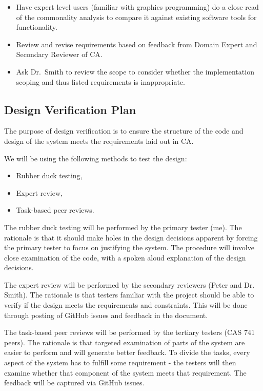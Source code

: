 \documentclass[12pt, titlepage]{article}
\begin{document}
\begin{itemize}
	\item Have expert level users (familiar with graphics programming) do a 
	close read of the commonality analysis to compare it against existing 
	software tools for functionality. 
	\item Review and revise requirements based on feedback from Domain Expert 
	and Secondary Reviewer of CA.
      \item Ask Dr.\ Smith  to review the scope to consider whether
        the implementation scoping and thus listed requirements is
        inappropriate.
\end{itemize}

\subsection{Design Verification Plan}
The purpose of design verification is to ensure the structure of the code and 
design of the system meets the requirements laid out in CA.

We will be using the following methods to test the design:

\begin{itemize}
	\item Rubber duck testing,
	\item Expert review,
	\item Task-based peer reviews.
\end{itemize}

The rubber duck testing will be performed by the primary tester (me). The 
rationale is that it should make holes in the design decisions apparent by 
forcing the primary tester to focus on justifying the system. The procedure 
will involve close examination of the code, with a spoken aloud explanation of 
the design decisions.

The expert review will be performed by the secondary reviewers (Peter and Dr. 
Smith). The rationale is that testers familiar with the project should be able 
to verify if the design meets the requirements and constraints. This will be 
done through posting of GitHub issues and feedback in the document.

The task-based peer reviews will be performed by the tertiary testers (CAS 741 
peers). The rationale is that targeted examination of parts of the system are 
easier to perform and will generate better feedback. To divide the tasks, every 
aspect of the system has to fulfill some requirement - the testers will then 
examine whether that component of the system meets that requirement. The 
feedback will be captured via GitHub issues.
\end{document}
